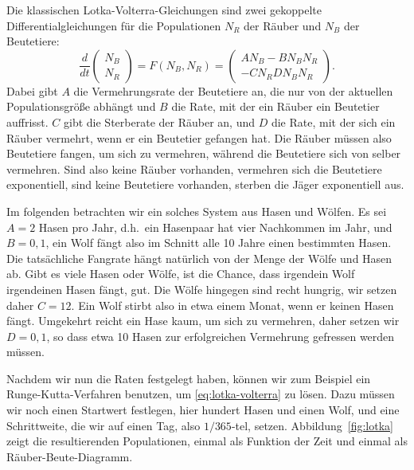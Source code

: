 Die klassischen Lotka-Volterra-Gleichungen sind zwei gekoppelte
Differentialgleichungen für die Populationen $N_R$ der Räuber und
$N_B$ der Beutetiere:
\begin{equation}
  \label{eq:lotka-volterra}
  \frac{d}{dt}
  \begin{pmatrix}
    N_B\\
    N_R
  \end{pmatrix}
  = F(N_B, N_R) = 
  \begin{pmatrix}
    A N_B  - B N_BN_R\\
    -C N_R  D N_BN_R
  \end{pmatrix}.
\end{equation}
Dabei gibt $A$ die Vermehrungsrate der Beutetiere an, die nur von der
aktuellen Populationsgröße abhängt und $B$ die Rate, mit der ein
Räuber ein Beutetier auffrisst. $C$ gibt die Sterberate der Räuber an,
und $D$ die Rate, mit der sich ein Räuber vermehrt, wenn er ein
Beutetier gefangen hat. Die Räuber müssen also Beutetiere fangen, um
sich zu vermehren, während die Beutetiere sich von selber
vermehren. Sind also keine Räuber vorhanden, vermehren sich die
Beutetiere exponentiell, sind keine Beutetiere vorhanden, sterben die
Jäger exponentiell aus.

Im folgenden betrachten wir ein solches System aus Hasen und
Wölfen. Es sei $A=2$ Hasen pro Jahr, d.h.\ ein Hasenpaar hat vier
Nachkommen im Jahr, und $B=0,1$, ein Wolf fängt also im Schnitt alle
10 Jahre einen bestimmten Hasen. Die tatsächliche Fangrate hängt
natürlich von der Menge der Wölfe und Hasen ab. Gibt es viele Hasen
oder Wölfe, ist die Chance, dass irgendein Wolf irgendeinen Hasen
fängt, gut. Die Wölfe hingegen sind recht hungrig, wir setzen daher
$C=12$. Ein Wolf stirbt also in etwa einem Monat, wenn er keinen Hasen
fängt. Umgekehrt reicht ein Hase kaum, um sich zu vermehren, daher
setzen wir $D=0,1$, so dass etwa 10 Hasen zur erfolgreichen Vermehrung
gefressen werden müssen.

Nachdem wir nun die Raten festgelegt haben, können wir zum Beispiel
ein Runge-Kutta-Verfahren benutzen, um \eqref{eq:lotka-volterra} zu
lösen. Dazu müssen wir noch einen Startwert festlegen, hier hundert
Hasen und einen Wolf, und eine Schrittweite, die wir auf einen Tag,
also $1/365$-tel, setzen. Abbildung~\ref{fig:lotka} zeigt die
resultierenden Populationen, einmal als Funktion der Zeit und einmal
als Räuber-Beute-Diagramm.

